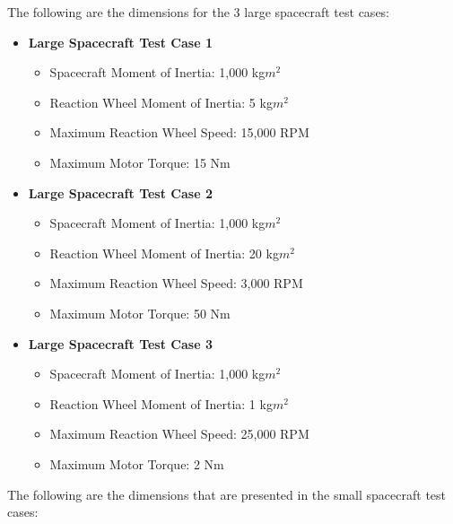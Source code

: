 \documentclass{ifacconf}
\begin{document}
The following are the dimensions for the 3 large spacecraft test cases:

\begin{itemize}
    \item \textbf{Large Spacecraft Test Case 1}
        \begin{itemize}
            \item Spacecraft Moment of Inertia: 1,000 kg$m^2$
            \item Reaction Wheel Moment of Inertia: 5 kg$m^2$
            \item Maximum Reaction Wheel Speed: 15,000 RPM
            \item Maximum Motor Torque: 15 Nm
        \end{itemize}
        \vspace{0.2cm}
    \item \textbf{Large Spacecraft Test Case 2}
\begin{itemize}
            \item Spacecraft Moment of Inertia: 1,000 kg$m^2$
            \item Reaction Wheel Moment of Inertia: 20 kg$m^2$
            \item Maximum Reaction Wheel Speed: 3,000 RPM
            \item Maximum Motor Torque: 50 Nm

        \end{itemize}
        \vspace{0.2cm}
    \item \textbf{Large Spacecraft Test Case 3}
        \begin{itemize}
            \item Spacecraft Moment of Inertia: 1,000 kg$m^2$
            \item Reaction Wheel Moment of Inertia: 1 kg$m^2$
            \item Maximum Reaction Wheel Speed: 25,000 RPM
            \item Maximum Motor Torque: 2 Nm
        \end{itemize}
\end{itemize}

The following are the dimensions that are presented in the small spacecraft test cases: 
\end{document}

